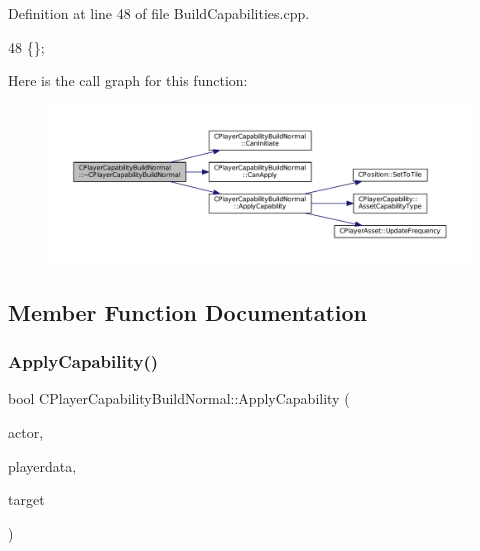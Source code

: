 Definition at line 48 of file Build\+Capabilities.\+cpp.


\begin{DoxyCode}
48 \{\};
\end{DoxyCode}
Here is the call graph for this function\+:
\nopagebreak
\begin{figure}[H]
\begin{center}
\leavevmode
\includegraphics[width=350pt]{classCPlayerCapabilityBuildNormal_aed39be621a98ed6d1aaf470cd5bf1ff5_cgraph}
\end{center}
\end{figure}


\subsection{Member Function Documentation}
\hypertarget{classCPlayerCapabilityBuildNormal_afc2fbda17580385a4028d44cd03c9149}{}\label{classCPlayerCapabilityBuildNormal_afc2fbda17580385a4028d44cd03c9149} 
\subsubsection{\texorpdfstring{Apply\+Capability()}{ApplyCapability()}}
{\footnotesize\ttfamily bool C\+Player\+Capability\+Build\+Normal\+::\+Apply\+Capability (\begin{DoxyParamCaption}\item[{std\+::shared\+\_\+ptr$<$ \hyperlink{classCPlayerAsset}{C\+Player\+Asset} $>$}]{actor,  }\item[{std\+::shared\+\_\+ptr$<$ \hyperlink{classCPlayerData}{C\+Player\+Data} $>$}]{playerdata,  }\item[{std\+::shared\+\_\+ptr$<$ \hyperlink{classCPlayerAsset}{C\+Player\+Asset} $>$}]{target }\end{DoxyParamCaption})\hspace{0.3cm}{\ttfamily [virtual]}}



